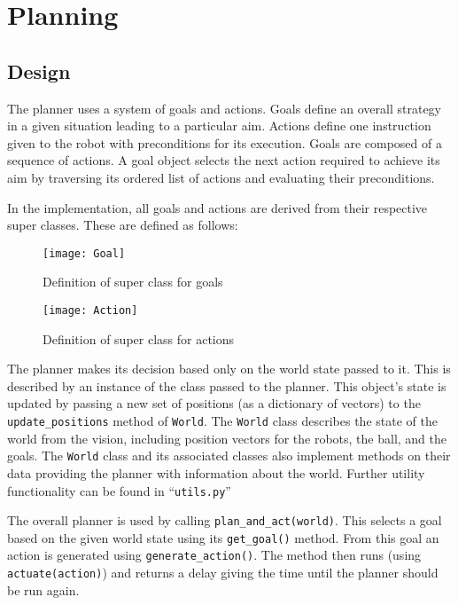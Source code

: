 \section{Planning}
\lstset{language=Python, showstringspaces=false}


\subsection{Design}

The planner uses a system of goals and actions. Goals define an overall strategy in a given situation leading to a particular aim. Actions define one instruction given to the robot with preconditions for its execution. Goals are composed of a sequence of actions. A goal object selects the next action required to achieve its aim by traversing its ordered list of actions and evaluating their preconditions.

In the implementation, all goals and actions are derived from their respective super classes. These are defined as follows:

\begin{figure}[H]
	\centering
    \texttt{[image: Goal]}
    \caption{Definition of super class for goals}
\end{figure}


\begin{figure}[H]
	\centering
    \texttt{[image: Action]}
    \caption{Definition of super class for actions}
\end{figure}


The planner makes its decision based only on the world state passed to it. This is described by an instance of the  class passed to the planner. This object's state is updated by passing a new set of positions (as a dictionary of vectors) to the \texttt{update\_positions} method of \texttt{World}. The \texttt{World} class describes the state of the world from the vision, including position vectors for the robots, the ball, and the goals. The \texttt{World} class and its associated classes also implement methods on their data providing the planner with information about the world. Further utility functionality can be found in ``\texttt{utils.py}''

The overall planner is used by calling \texttt{plan\_and\_act(world)}.
This selects a goal based on the given world state  using its \texttt{get\_goal()} method. From this goal an action is generated using \texttt{generate\_action()}. The method then runs (using \texttt{actuate(action)}) and returns a delay giving the time until the planner should be run again.

